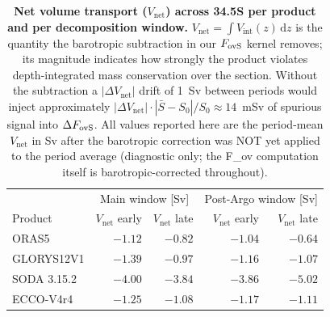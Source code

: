 \begin{table}[h]
\centering
\caption{\textbf{Net volume transport ($V_\mathrm{net}$) across 34.5\textdegree S per product and per decomposition window.} $V_\mathrm{net} = \int V_\mathrm{int}(z)\,\mathrm{d}z$ is the quantity the barotropic subtraction in our $F_\mathrm{ovS}$ kernel removes; its magnitude indicates how strongly the product violates depth-integrated mass conservation over the section. Without the subtraction a $|\Delta V_\mathrm{net}|$ drift of 1~Sv between periods would inject approximately $|\Delta V_\mathrm{net}|\cdot|\bar{S}-S_0|/S_0 \approx 14$~mSv of spurious signal into $\Delta F_\mathrm{ovS}$. All values reported here are the period-mean $V_\mathrm{net}$ in Sv after the barotropic correction was NOT yet applied to the period average (diagnostic only; the F_ov computation itself is barotropic-corrected throughout).}
\label{tab:vnet}
\small
\begin{tabular}{l|rr|rr}
\hline\hline
 & \multicolumn{2}{c|}{Main window [Sv]} & \multicolumn{2}{c}{Post-Argo window [Sv]} \\
Product & $V_\mathrm{net}$ early & $V_\mathrm{net}$ late & $V_\mathrm{net}$ early & $V_\mathrm{net}$ late \\
\hline
ORAS5 & $-1.12$ & $-0.82$ & $-1.04$ & $-0.64$ \\
GLORYS12V1 & $-1.39$ & $-0.97$ & $-1.16$ & $-1.07$ \\
SODA 3.15.2 & $-4.00$ & $-3.84$ & $-3.86$ & $-5.02$ \\
ECCO-V4r4 & $-1.25$ & $-1.08$ & $-1.17$ & $-1.11$ \\
\hline\hline
\end{tabular}
\end{table}
